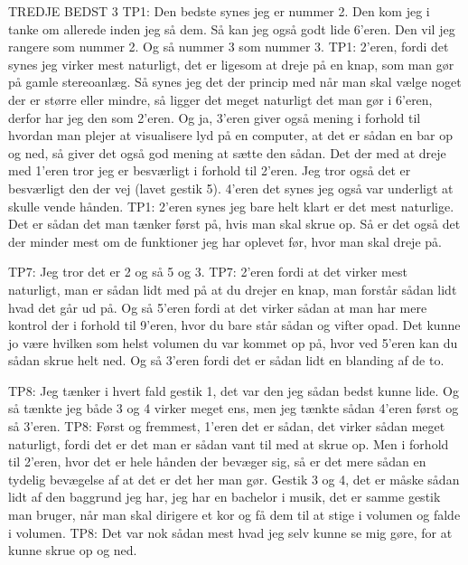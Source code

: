 TREDJE BEDST 3
TP1: Den bedste synes jeg er nummer 2. Den kom jeg i tanke om allerede inden jeg så dem. Så kan jeg også godt lide 6’eren. Den vil jeg rangere som nummer 2. Og så nummer 3 som nummer 3.
TP1: 2’eren, fordi det synes jeg virker mest naturligt, det er ligesom at dreje på en knap, som man gør på gamle stereoanlæg. Så synes jeg det der princip med når man skal vælge noget der er større eller mindre, så ligger det meget naturligt det man gør i 6’eren, derfor har jeg den som 2’eren. Og ja, 3’eren giver også mening i forhold til hvordan man plejer at visualisere lyd på en computer, at det er sådan en bar op og ned, så giver det også god mening at sætte den sådan. Det der med at dreje med 1’eren tror jeg er besværligt i forhold til 2’eren. Jeg tror også det er besværligt den der vej (lavet gestik 5). 4’eren det synes jeg også var underligt at skulle vende hånden. 
TP1: 2’eren synes jeg bare helt klart er det mest naturlige. Det er sådan det man tænker først på, hvis man skal skrue op. Så er det også det der minder mest om de funktioner jeg har oplevet før, hvor man skal dreje på.

TP7:  Jeg tror det er 2 og så 5 og 3. 
TP7: 2’eren fordi at det virker mest naturligt, man er sådan lidt med på at du drejer en knap, man forstår sådan lidt hvad det går ud på. Og så 5’eren fordi at det virker sådan at man har mere kontrol der i forhold til 9’eren, hvor du bare står sådan og vifter opad. Det kunne jo være hvilken som helst volumen du var kommet op på, hvor ved 5’eren kan du sådan skrue helt ned. Og så 3’eren fordi det er sådan lidt en blanding af de to. 

TP8: Jeg tænker i hvert fald gestik 1, det var den jeg sådan bedst kunne lide. Og så tænkte jeg både 3 og 4 virker meget ens, men jeg tænkte sådan 4’eren først og så 3’eren. 
TP8: Først og fremmest, 1’eren det er sådan, det virker sådan meget naturligt, fordi det er det man er sådan vant til med at skrue op. Men i forhold til 2’eren, hvor det er hele hånden der bevæger sig, så er det mere sådan en tydelig bevægelse af at det er det her man gør. Gestik 3 og 4, det er måske sådan lidt af den baggrund jeg har, jeg har en bachelor i musik, det er samme gestik man bruger, når man skal dirigere et kor og få dem til at stige i volumen og falde i volumen. 
TP8: Det var nok sådan mest hvad jeg selv kunne se mig gøre, for at kunne skrue op og ned.

